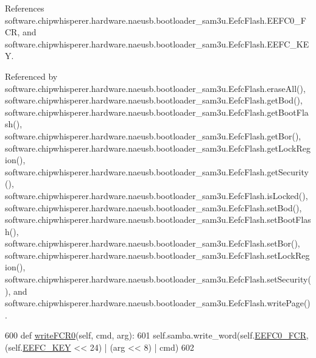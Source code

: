 References software.\+chipwhisperer.\+hardware.\+naeusb.\+bootloader\+\_\+sam3u.\+Eefc\+Flash.\+E\+E\+F\+C0\+\_\+\+F\+C\+R, and software.\+chipwhisperer.\+hardware.\+naeusb.\+bootloader\+\_\+sam3u.\+Eefc\+Flash.\+E\+E\+F\+C\+\_\+\+K\+E\+Y.



Referenced by software.\+chipwhisperer.\+hardware.\+naeusb.\+bootloader\+\_\+sam3u.\+Eefc\+Flash.\+erase\+All(), software.\+chipwhisperer.\+hardware.\+naeusb.\+bootloader\+\_\+sam3u.\+Eefc\+Flash.\+get\+Bod(), software.\+chipwhisperer.\+hardware.\+naeusb.\+bootloader\+\_\+sam3u.\+Eefc\+Flash.\+get\+Boot\+Flash(), software.\+chipwhisperer.\+hardware.\+naeusb.\+bootloader\+\_\+sam3u.\+Eefc\+Flash.\+get\+Bor(), software.\+chipwhisperer.\+hardware.\+naeusb.\+bootloader\+\_\+sam3u.\+Eefc\+Flash.\+get\+Lock\+Region(), software.\+chipwhisperer.\+hardware.\+naeusb.\+bootloader\+\_\+sam3u.\+Eefc\+Flash.\+get\+Security(), software.\+chipwhisperer.\+hardware.\+naeusb.\+bootloader\+\_\+sam3u.\+Eefc\+Flash.\+is\+Locked(), software.\+chipwhisperer.\+hardware.\+naeusb.\+bootloader\+\_\+sam3u.\+Eefc\+Flash.\+set\+Bod(), software.\+chipwhisperer.\+hardware.\+naeusb.\+bootloader\+\_\+sam3u.\+Eefc\+Flash.\+set\+Boot\+Flash(), software.\+chipwhisperer.\+hardware.\+naeusb.\+bootloader\+\_\+sam3u.\+Eefc\+Flash.\+set\+Bor(), software.\+chipwhisperer.\+hardware.\+naeusb.\+bootloader\+\_\+sam3u.\+Eefc\+Flash.\+set\+Lock\+Region(), software.\+chipwhisperer.\+hardware.\+naeusb.\+bootloader\+\_\+sam3u.\+Eefc\+Flash.\+set\+Security(), and software.\+chipwhisperer.\+hardware.\+naeusb.\+bootloader\+\_\+sam3u.\+Eefc\+Flash.\+write\+Page().


\begin{DoxyCode}
600     \textcolor{keyword}{def }\hyperlink{classsoftware_1_1chipwhisperer_1_1hardware_1_1naeusb_1_1bootloader__sam3u_1_1EefcFlash_aa255adaa75a4bd666c3b290b573ae7dd}{writeFCR0}(self, cmd, arg):
601         self.samba.write\_word(self.\hyperlink{classsoftware_1_1chipwhisperer_1_1hardware_1_1naeusb_1_1bootloader__sam3u_1_1EefcFlash_a55482fa96af1e5eadea991bf7a7ec8ef}{EEFC0\_FCR}, (self.\hyperlink{classsoftware_1_1chipwhisperer_1_1hardware_1_1naeusb_1_1bootloader__sam3u_1_1EefcFlash_ac838bb53fa740659d7977b0ac60462ea}{EEFC\_KEY} << 24) | (arg << 8) | cmd)
602 
\end{DoxyCode}
\hypertarget{classsoftware_1_1chipwhisperer_1_1hardware_1_1naeusb_1_1bootloader__sam3u_1_1EefcFlash_a2dcb5f8d2daab0a339919c1d3240e4c0}{}
